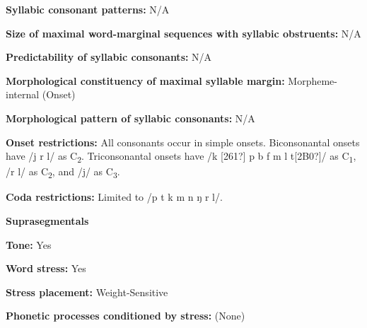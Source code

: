 \begin{styleBody}
\textbf{Syllabic consonant patterns:} N/A
\end{styleBody}

\begin{styleBody}
\textbf{Size of maximal word{}-marginal sequences with syllabic obstruents:} N/A
\end{styleBody}

\begin{styleBody}
\textbf{Predictability of syllabic consonants:} N/A
\end{styleBody}

\begin{styleBody}
\textbf{Morphological constituency of maximal syllable margin:} Morpheme-internal (Onset)
\end{styleBody}

\begin{styleBody}
\textbf{Morphological pattern of syllabic consonants:} N/A
\end{styleBody}

\begin{styleBody}
\textbf{Onset restrictions: }All consonants occur in simple onsets. Biconsonantal onsets have /j r l/ as C\textsubscript{2}. Triconsonantal onsets have /k [261?] p b f m l t[2B0?]/ as C\textsubscript{1}, /r l/ as C\textsubscript{2}, and /j/ as C\textsubscript{3}.
\end{styleBody}

\begin{styleBody}
\textbf{Coda restrictions: }Limited to /p t k m n ŋ r l/.
\end{styleBody}

\begin{styleBody}
\textbf{Suprasegmentals}
\end{styleBody}

\begin{styleBody}
\textbf{Tone:} Yes
\end{styleBody}

\begin{styleBody}
\textbf{Word stress:} Yes
\end{styleBody}

\begin{styleBody}
\textbf{Stress placement:} Weight-Sensitive
\end{styleBody}

\begin{styleBody}
\textbf{Phonetic processes conditioned by stress:} (None)
\end{styleBody}


